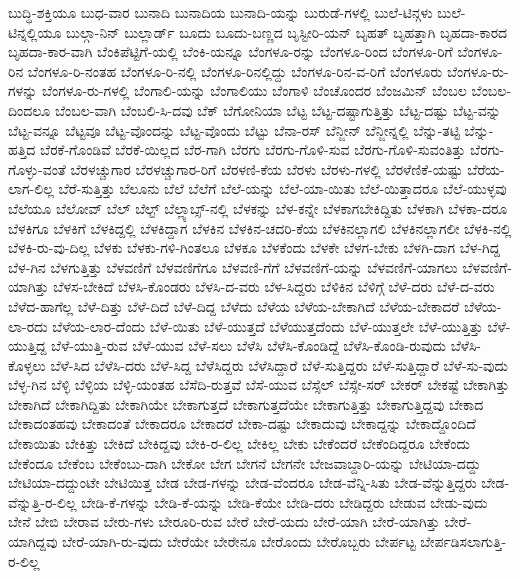 {ಬುದ್ಧಿ-ಶಕ್ತಿಯೂ
ಬುಧ-ವಾರ
ಬುನಾದಿ
ಬುನಾದಿಯ
ಬುನಾದಿ-ಯನ್ನು
ಬುರುಡೆ-ಗಳಲ್ಲಿ
ಬುಲೆ-ಟಿನ್ಗಳು
ಬುಲೆ-ಟಿನ್ನಲ್ಲಿಯೂ
ಬುಲ್ಗಾ-ನಿನ್
ಬುಲ್ಲಾರ್ಡ್
ಬೂದು
ಬೂದು-ಬಣ್ಣದ
ಬೃಸ್ಟೀರಿ-ಯನ್
ಬೃಹತ್
ಬೃಹತ್ತಾಗಿ
ಬೃಹದಾ-ಕಾರದ
ಬೃಹದಾ-ಕಾರ-ವಾಗಿ
ಬೆಂಕಿಪೆಟ್ಟಿಗೆ-ಯಲ್ಲಿ
ಬೆಂಕಿ-ಯನ್ನೂ
ಬೆಂಗಳೂ-ರನ್ನು
ಬೆಂಗಳೂ-ರಿಂದ
ಬೆಂಗಳೂ-ರಿಗೆ
ಬೆಂಗಳೂ-ರಿನ
ಬೆಂಗಳೂ-ರಿ-ನಂತಹ
ಬೆಂಗಳೂ-ರಿ-ನಲ್ಲಿ
ಬೆಂಗಳೂ-ರಿನಲ್ಲಿದ್ದು
ಬೆಂಗಳೂ-ರಿನ-ವ-ರಿಗೆ
ಬೆಂಗಳೂರು
ಬೆಂಗಳೂ-ರು-ಗಳನ್ನು
ಬೆಂಗಳೂ-ರು-ಗಳಲ್ಲಿ
ಬೆಂಗಾಲಿ-ಯನ್ನು
ಬೆಂಗಾಲಿಯು
ಬೆಂಗಾಳಿ
ಬೆಂಚೊಂದರ
ಬೆಂಜಮಿನ್
ಬೆಂಬಲ
ಬೆಂಬಲ-ದಿಂದಲೂ
ಬೆಂಬಲ-ವಾಗಿ
ಬೆಂಬಲಿ-ಸಿ-ದವು
ಬೆಕ್
ಬೆಗೋನಿಯಾ
ಬೆಟ್ಟ
ಬೆಟ್ಟ-ದಷ್ಟಾಗುತ್ತಿತ್ತು
ಬೆಟ್ಟ-ದಷ್ಟು
ಬೆಟ್ಟ-ವನ್ನು
ಬೆಟ್ಟ-ವನ್ನೂ
ಬೆಟ್ಟವೂ
ಬೆಟ್ಟ-ವೊಂದನ್ನು
ಬೆಟ್ಟ-ವೊಂದು
ಬೆಟ್ಟು
ಬೆನಾ-ರಸ್
ಬೆನ್ಜೀನ್
ಬೆನ್ಜೀನ್ನಲ್ಲಿ
ಬೆನ್ನು-ತಟ್ಟಿ
ಬೆನ್ನು-ಹತ್ತಿದ
ಬೆರಕೆ-ಗೊಂಡಿವೆ
ಬೆರಕೆ-ಯಿಲ್ಲದ
ಬೆರ-ಗಾಗಿ
ಬೆರಗು
ಬೆರಗು-ಗೊಳಿ-ಸುವ
ಬೆರಗು-ಗೊಳಿ-ಸುವಂತಿತ್ತು
ಬೆರಗು-ಗೊಳ್ಳು-ವಂತೆ
ಬೆರಳಚ್ಚುಗಾರ
ಬೆರಳಚ್ಚುಗಾರ-ರಿಗೆ
ಬೆರಳಣಿ-ಕೆಯ
ಬೆರಳು
ಬೆರಳು-ಗಳಲ್ಲಿ
ಬೆರಳೆಣಿಕೆ-ಯಷ್ಟು
ಬೆರೆಯ-ಲಾಗ-ಲಿಲ್ಲ
ಬೆರೆ-ಸುತ್ತಿತ್ತು
ಬೆಲೂನು
ಬೆಲೆ
ಬೆಲೆಗೆ
ಬೆಲೆ-ಯನ್ನು
ಬೆಲೆ-ಯಾ-ಯಿತು
ಬೆಲೆ-ಯಿತ್ತಾದರೂ
ಬೆಲೆ-ಯುಳ್ಳವು
ಬೆಲೆಯೂ
ಬೆಲೋವ್
ಬೆಲ್
ಬೆಲ್ಟ್
ಬೆಲ್ಲ್ಯಾಬ್ಸ್-ನಲ್ಲಿ
ಬೆಳಕನ್ನು
ಬೆಳ-ಕನ್ನೇ
ಬೆಳಕಾಗಬೇಕಿದ್ದಿತು
ಬೆಳಕಾಗಿ
ಬೆಳಕಾ-ದರೂ
ಬೆಳಕಿಗೂ
ಬೆಳಕಿಗೆ
ಬೆಳಕಿದ್ದಲ್ಲಿ
ಬೆಳಕಿದ್ದಾಗ
ಬೆಳಕಿನ
ಬೆಳಕಿನ-ಚದರಿ-ಕೆಯ
ಬೆಳಕಿನಲ್ಲಾಗಲಿ
ಬೆಳಕಿನಲ್ಲಾಗಲೀ
ಬೆಳಕಿ-ನಲ್ಲಿ
ಬೆಳಕಿ-ರು-ವು-ದಿಲ್ಲ
ಬೆಳಕು
ಬೆಳಕು-ಗಳಿ-ಗಿಂತಲೂ
ಬೆಳಕೂ
ಬೆಳಕೆಂದು
ಬೆಳಕೇ
ಬೆಳಗ-ಬೇಕು
ಬೆಳಗಿ-ದಾಗ
ಬೆಳ-ಗಿದ್ದ
ಬೆಳ-ಗಿನ
ಬೆಳಗುತ್ತಿತ್ತು
ಬೆಳವಣಿಗೆ
ಬೆಳವಣಿಗೆಗೂ
ಬೆಳವಣಿ-ಗೆಗೆ
ಬೆಳವಣಿಗೆ-ಯನ್ನು
ಬೆಳವಣಿಗೆ-ಯಾಗಲು
ಬೆಳವಣಿಗೆ-ಯಾಗಿತ್ತು
ಬೆಳಸ-ಬೇಕಿದೆ
ಬೆಳಸಿ-ಕೊಂಡರು
ಬೆಳಸಿ-ದ-ವರು
ಬೆಳ-ಸಿದ್ದರು
ಬೆಳಿಕಿನ
ಬೆಳಿಗ್ಗೆ
ಬೆಳೆ-ದರು
ಬೆಳೆ-ದ-ವರು
ಬೆಳೆದ-ಹಾಗೆಲ್ಲ
ಬೆಳೆ-ದಿತ್ತು
ಬೆಳೆ-ದಿದೆ
ಬೆಳೆ-ದಿದ್ದ
ಬೆಳೆದು
ಬೆಳೆಯ
ಬೆಳೆಯ-ಬೇಕಾಗಿದೆ
ಬೆಳೆಯ-ಬೇಕಾದರೆ
ಬೆಳೆಯ-ಲಾ-ರದು
ಬೆಳೆಯ-ಲಾರ-ದೆಂದು
ಬೆಳೆ-ಯಿತು
ಬೆಳೆ-ಯುತ್ತದೆ
ಬೆಳೆಯುತ್ತದೆಂದು
ಬೆಳೆ-ಯುತ್ತಲೇ
ಬೆಳೆ-ಯುತ್ತಿತ್ತು
ಬೆಳೆ-ಯುತ್ತಿದ್ದ
ಬೆಳೆ-ಯುತ್ತಿ-ರುವ
ಬೆಳೆ-ಯುವ
ಬೆಳೆ-ಸಲು
ಬೆಳೆಸಿ
ಬೆಳೆಸಿ-ಕೊಂಡಿದ್ದೆ
ಬೆಳೆಸಿ-ಕೊಂಡಿ-ರುವುದು
ಬೆಳೆಸಿ-ಕೊಳ್ಳಲು
ಬೆಳೆ-ಸಿದ
ಬೆಳೆಸಿ-ದರು
ಬೆಳೆ-ಸಿದ್ದ
ಬೆಳೆಸಿದ್ದರು
ಬೆಳೆಸಿದ್ದಾರೆ
ಬೆಳೆ-ಸುತ್ತಿದ್ದರು
ಬೆಳೆ-ಸುತ್ತಿದ್ದಾರೆ
ಬೆಳೆ-ಸು-ವುದು
ಬೆಳ್ಳ-ಗಿನ
ಬೆಳ್ಳಿ
ಬೆಳ್ಳಿಯ
ಬೆಳ್ಳಿ-ಯಂತಹ
ಬೆಸೆದಿ-ರುತ್ತವೆ
ಬೆಸೆ-ಯುವ
ಬೆಸ್ಸೆಲ್
ಬೆಸ್ಸೇ-ಸರ್
ಬೇಕರ್
ಬೇಕಷ್ಟೆ
ಬೇಕಾಗಿತ್ತು
ಬೇಕಾಗಿದೆ
ಬೇಕಾಗಿದ್ದಿತು
ಬೇಕಾಗಿಯೇ
ಬೇಕಾಗುತ್ತದೆ
ಬೇಕಾಗುತ್ತದೆಯೇ
ಬೇಕಾಗುತ್ತಿತ್ತು
ಬೇಕಾಗುತ್ತಿದ್ದವು
ಬೇಕಾದ
ಬೇಕಾದಂತಹವು
ಬೇಕಾದಂತೆ
ಬೇಕಾದರೂ
ಬೇಕಾದರೆ
ಬೇಕಾ-ದಷ್ಟು
ಬೇಕಾದುವು
ಬೇಕಾದ್ದನ್ನು
ಬೇಕಾದ್ದೊಂದಿದೆ
ಬೇಕಾಯಿತು
ಬೇಕಿತ್ತು
ಬೇಕಿದೆ
ಬೇಕಿದ್ದವು
ಬೇಕಿ-ರ-ಲಿಲ್ಲ
ಬೇಕಿಲ್ಲ
ಬೇಕು
ಬೇಕೆಂದರೆ
ಬೇಕೆಂದಿದ್ದರೂ
ಬೇಕೆಂದು
ಬೇಕೆಂದೂ
ಬೇಕೆಂಬ
ಬೇಕೆಂಬು-ದಾಗಿ
ಬೇಕೋ
ಬೇಗ
ಬೇಗನೆ
ಬೇಗನೇ
ಬೇಜವಾಬ್ದಾರಿ-ಯನ್ನು
ಬೇಟಿಯಾ-ದದ್ದು
ಬೇಟಿಯಾ-ದದ್ದುಂಟೇ
ಬೇಟಿಯಿತ್ತ
ಬೇಡ
ಬೇಡ-ಗಳನ್ನು
ಬೇಡ-ವೆಂದರೂ
ಬೇಡ-ವೆನ್ನಿ-ಸಿತು
ಬೇಡ-ವೆನ್ನುತ್ತಿದ್ದರು
ಬೇಡ-ವೆನ್ನುತ್ತಿ-ರ-ಲಿಲ್ಲ
ಬೇಡಿ-ಕೆ-ಗಳನ್ನು
ಬೇಡಿ-ಕೆ-ಯನ್ನು
ಬೇಡಿ-ಕೆಯೇ
ಬೇಡಿ-ದರು
ಬೇಡಿದ್ದರು
ಬೇಡುವ
ಬೇಡು-ವುದು
ಬೇನೆ
ಬೇಬಿ
ಬೇರಾವ
ಬೇರು-ಗಳು
ಬೇರೂರಿ-ರುವ
ಬೇರೆ
ಬೇರೆ-ಯದು
ಬೇರೆ-ಯಾಗಿ
ಬೇರೆ-ಯಾಗಿತ್ತು
ಬೇರೆ-ಯಾಗಿದ್ದವು
ಬೇರೆ-ಯಾಗಿ-ರು-ವುದು
ಬೇರೆಯೇ
ಬೇರೇನೂ
ಬೇರೊಂದು
ಬೇರೊಬ್ಬರು
ಬೇರ್ಪಟ್ಟ
ಬೇರ್ಪಡಿಸಲಾಗುತ್ತಿ-ರ-ಲಿಲ್ಲ
}
